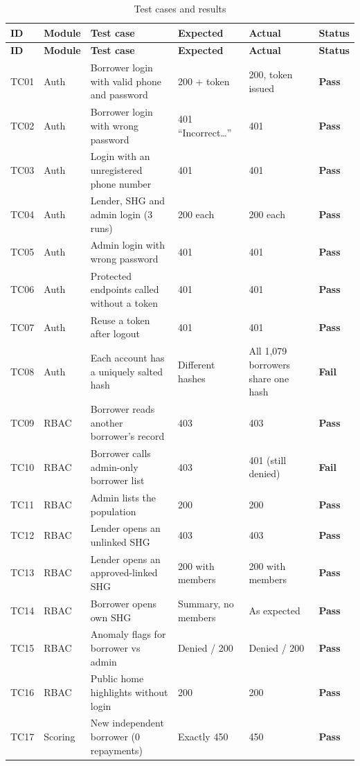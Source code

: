 \documentclass[11pt,a4paper]{article}
\newcommand{\pass}{\textbf{Pass}}
\newcommand{\fail}{\textbf{\textcolor{red!70!black}{Fail}}}
\begin{document}
\small
\begin{longtable}{@{}lL{1.95cm}L{4.3cm}L{2.9cm}L{2.5cm}l@{}}
\caption{Test cases and results}\label{tab:tc}\\
\toprule
\textbf{ID} & \textbf{Module} & \textbf{Test case} & \textbf{Expected} & \textbf{Actual} & \textbf{Status}\\
\midrule
\endfirsthead
\toprule
\textbf{ID} & \textbf{Module} & \textbf{Test case} & \textbf{Expected} & \textbf{Actual} & \textbf{Status}\\
\midrule
\endhead
\bottomrule
\endfoot
TC01 & Auth & Borrower login with valid phone and password & 200 + token & 200, token issued & \pass\\
TC02 & Auth & Borrower login with wrong password & 401 ``Incorrect\dots'' & 401 & \pass\\
TC03 & Auth & Login with an unregistered phone number & 401 & 401 & \pass\\
TC04 & Auth & Lender, SHG and admin login (3 runs) & 200 each & 200 each & \pass\\
TC05 & Auth & Admin login with wrong password & 401 & 401 & \pass\\
TC06 & Auth & Protected endpoints called without a token & 401 & 401 & \pass\\
TC07 & Auth & Reuse a token after logout & 401 & 401 & \pass\\
TC08 & Auth & Each account has a uniquely salted hash & Different hashes & All 1{,}079 borrowers share one hash & \fail\\
TC09 & RBAC & Borrower reads another borrower's record & 403 & 403 & \pass\\
TC10 & RBAC & Borrower calls admin-only borrower list & 403 & 401 (still denied) & \fail\\
TC11 & RBAC & Admin lists the population & 200 & 200 & \pass\\
TC12 & RBAC & Lender opens an unlinked SHG & 403 & 403 & \pass\\
TC13 & RBAC & Lender opens an approved-linked SHG & 200 with members & 200 with members & \pass\\
TC14 & RBAC & Borrower opens own SHG & Summary, no members & As expected & \pass\\
TC15 & RBAC & Anomaly flags for borrower vs admin & Denied / 200 & Denied / 200 & \pass\\
TC16 & RBAC & Public home highlights without login & 200 & 200 & \pass\\
TC17 & Scoring & New independent borrower (0 repayments) & Exactly 450 & 450 & \pass\\

\end{longtable}
\end{document}
